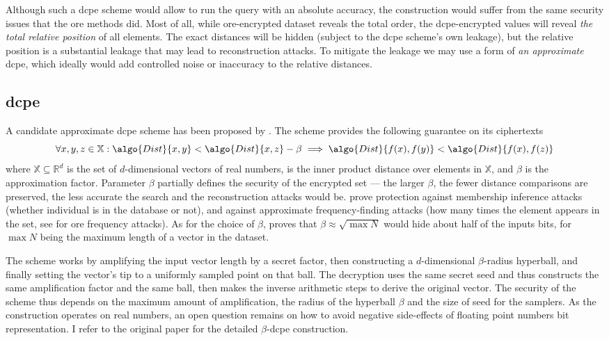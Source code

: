 		Although such a \acrfull{dcpe} scheme would allow to run the query with an absolute accuracy, the construction would suffer from the same security issues that the \acrshort{ore} methods did.
		Most of all, while \acrshort{ore}-encrypted dataset reveals the total order, the \acrshort{dcpe}-encrypted values will reveal \emph{the total relative position} of all elements.
		The exact distances will be hidden (subject to the \acrshort{dcpe} scheme's own leakage), but the relative position is a substantial leakage that may lead to reconstruction attacks.
		To mitigate the leakage we may use a form of \emph{an approximate} \acrshort{dcpe}, which ideally would add controlled noise or inaccuracy to the relative distances.

		\subsection{\acrlong{dcpe}}

			A candidate approximate \acrshort{dcpe} scheme has been proposed by \textcite{dcpe}.
			The scheme provides the following guarantee on its ciphertexts
			\[
				\forall x, y, z \in \mathbb{X} : \algo{Dist}{x, y} < \algo{Dist}{x, z} - \beta \implies \algo{Dist}{f(x), f(y)} < \algo{Dist}{f(x), f(z)}
			\]
			where $\mathbb{X} \subseteq \mathbb{R}^d$ is the set of $d$-dimensional vectors of real numbers,  is the inner product distance over elements in $\mathbb{X}$, and $\beta$ is the approximation factor.
			Parameter $\beta$ partially defines the security of the encrypted set --- the larger $\beta$, the fewer distance comparisons are preserved, the less accurate the search and the reconstruction attacks would be.
			\textcite{dcpe} prove protection against membership inference attacks \cite{memebership-inference-attacks-knn} (whether individual is in the database or not), and against approximate frequency-finding attacks (how many times the element appears in the set, see \cite{leakage-abuse-grubs-2017} for \acrshort{ore} frequency attacks).
			As for the choice of $\beta$, \cite{dcpe} proves that $\beta \approx \sqrt{\max N}$ would hide about half of the inputs bits, for $\max N$ being the maximum length of a vector in the dataset.

			The scheme works by amplifying the input vector length by a secret factor, then constructing a $d$-dimensional $\beta$-radius hyperball, and finally setting the vector's tip to a uniformly sampled point on that ball.
			The decryption uses the same secret seed and thus constructs the same amplification factor and the same ball, then makes the inverse arithmetic steps to derive the original vector.
			The security of the scheme thus depends on the maximum amount of amplification, the radius of the hyperball $\beta$ and the size of seed for the samplers.
			As the construction operates on real numbers, an open question remains on how to avoid negative side-effects of floating point numbers bit representation.
			I refer to the original paper \cite{dcpe} for the detailed $\beta$-\acrshort{dcpe} construction.

